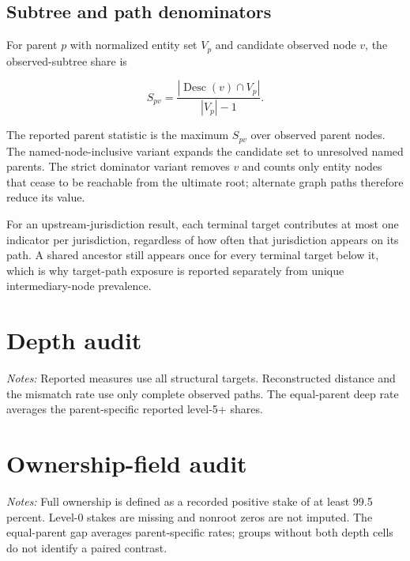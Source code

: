 \subsection{Subtree and path denominators}

For parent $p$ with normalized entity set $V_p$ and candidate observed node
$v$, the observed-subtree share is

\[
  S_{pv}=\frac{|\operatorname{Desc}(v)\cap V_p|}{|V_p|-1}.
\]

The reported parent statistic is the maximum $S_{pv}$ over observed parent
nodes. The named-node-inclusive variant expands the candidate set to unresolved
named parents. The strict dominator variant removes $v$ and counts only entity
nodes that cease to be reachable from the ultimate root; alternate graph paths
therefore reduce its value.

For an upstream-jurisdiction result, each terminal target contributes at most
one indicator per jurisdiction, regardless of how often that jurisdiction
appears on its path. A shared ancestor still appears once for every terminal
target below it, which is why target-path exposure is reported separately from
unique intermediary-node prevalence.

\section{Depth audit}
\label{app:depth}

\begin{table}[H]
\centering
\caption{Reported depth, reconstructed distance, and parent concentration}
\scriptsize
\resizebox{\textwidth}{!}{}
\begin{minipage}{0.98\textwidth}
\footnotesize\vspace{0.4em}
\textit{Notes:} Reported measures use all structural targets. Reconstructed
distance and the mismatch rate use only complete observed paths. The
equal-parent deep rate averages the parent-specific reported level-5+ shares.
\end{minipage}
\end{table}

\section{Ownership-field audit}
\label{app:ownership}

\begin{table}[H]
\centering
\caption{Stake coverage and ownership-depth diagnostics}
\scriptsize
\resizebox{\textwidth}{!}{}
\begin{minipage}{0.98\textwidth}
\footnotesize\vspace{0.4em}
\textit{Notes:} Full ownership is defined as a recorded positive stake of at
least 99.5 percent. Level-0 stakes are missing and nonroot zeros are not imputed.
The equal-parent gap averages parent-specific rates; groups without both depth
cells do not identify a paired contrast.
\end{minipage}
\end{table}

